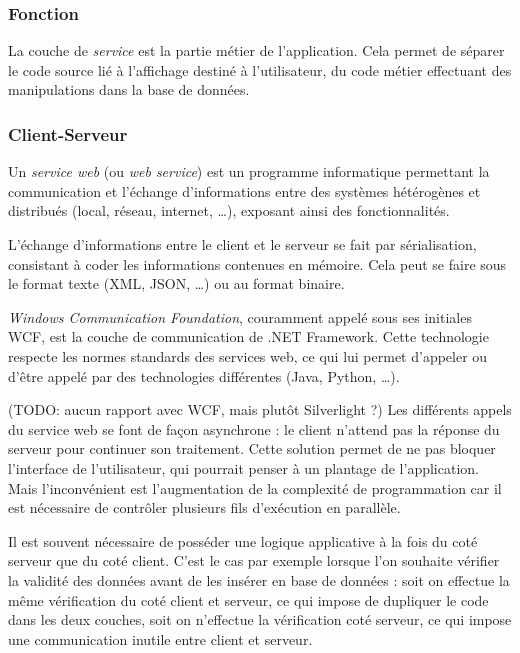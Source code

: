 
\subsubsection{Fonction}

La couche de \textit{service} est la partie métier de l'application. Cela permet de séparer le code source lié à l'affichage destiné à l'utilisateur, du code métier effectuant des manipulations dans la base de données.


\subsubsection{Client-Serveur}


Un \textit{service web} (ou \textit{web service}) est un programme informatique permettant la communication et l'échange d'informations entre des systèmes hétérogènes et distribués (local, réseau, internet, \ldots), exposant ainsi des fonctionnalités.

L'échange d'informations entre le client et le serveur se fait par sérialisation, consistant à coder les informations contenues en mémoire. Cela peut se faire sous le format texte (XML, JSON, \ldots) ou au format binaire.



\textit{Windows Communication Foundation}, couramment appelé sous ses initiales WCF, est la couche de communication de .NET Framework. Cette technologie respecte les normes standards des services web, ce qui lui permet d'appeler ou d'être appelé par des technologies différentes (Java, Python, \ldots).

(TODO: aucun rapport avec WCF, mais plutôt Silverlight ?)
Les différents appels du service web se font de façon asynchrone : le client n'attend pas la réponse du serveur pour continuer son traitement. Cette solution permet de ne pas bloquer l'interface de l'utilisateur, qui pourrait penser à un plantage de l'application. Mais l'inconvénient est l'augmentation de la complexité de programmation car il est nécessaire de contrôler plusieurs fils d'exécution en parallèle.



Il est souvent nécessaire de posséder une logique applicative à la fois du coté serveur que du coté client. C'est le cas par exemple lorsque l'on souhaite vérifier la validité des données avant de les insérer en base de données : soit on effectue la même vérification du coté client et serveur, ce qui impose de dupliquer le code dans les deux couches, soit on n'effectue la vérification coté serveur, ce qui impose une communication inutile entre client et serveur.

